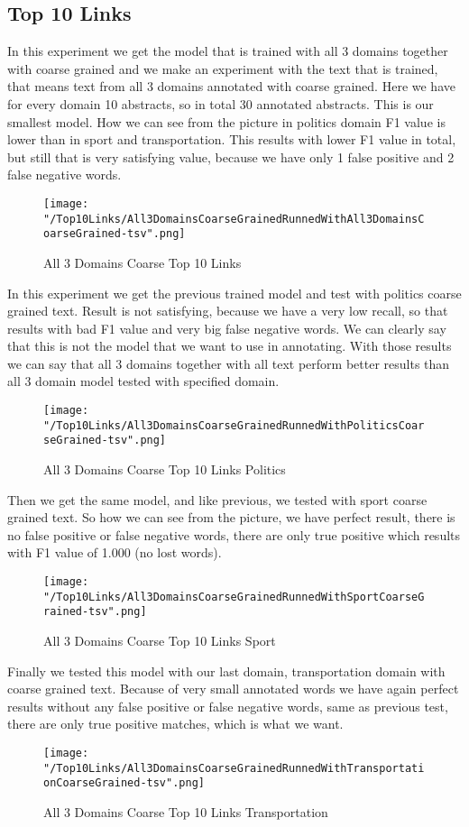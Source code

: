 \documentclass[thesis=M,english]{FITthesis}[2018/05/30]
\begin{document}
\subsection{Top 10 Links}\label{subsec:Top10}
	In this experiment we get the model that is trained with all 3 domains together with coarse grained and we make an experiment with the text that is trained, that means text from all 3 domains annotated with coarse grained. 
	Here we have for every domain 10 abstracts, so in total 30 annotated abstracts. This is our smallest model.
	How we can see from the picture in politics domain F1 value is lower than in sport and transportation. This results with lower F1 value in total, but still that is very satisfying value, because we have only 1 false positive and 2 false negative words.  
	\begin{figure}[H]\centering
		\texttt{[image: "/Top10Links/All3DomainsCoarseGrainedRunnedWithAll3DomainsCoarseGrained-tsv".png]}
		\caption{All 3 Domains Coarse Top 10 Links}\label{}
	\end{figure}
	
	
	In this experiment we get the previous trained model and test with politics coarse grained text. Result is not satisfying, because we have a very low recall, so that results with bad F1 value and very big false negative words. We can clearly say that this is not the model that we want to use in annotating. With those results we can say that all 3 domains together with all text perform better results than all 3 domain model tested with specified domain.  
	\begin{figure}[H]\centering
		\texttt{[image: "/Top10Links/All3DomainsCoarseGrainedRunnedWithPoliticsCoarseGrained-tsv".png]}
		\caption{All 3 Domains Coarse Top 10 Links Politics}\label{}
	\end{figure}	

	Then we get the same model, and like previous, we tested with sport coarse grained text. So how we can see from the picture, we have perfect result, there is no false positive or false negative words, there are only true positive which results with F1 value of 1.000 (no lost words).
	\begin{figure}[H]\centering
		\texttt{[image: "/Top10Links/All3DomainsCoarseGrainedRunnedWithSportCoarseGrained-tsv".png]}
		\caption{All 3 Domains Coarse Top 10 Links Sport}\label{}
	\end{figure}
	
	Finally we tested this model with our last domain, transportation domain with coarse grained text.	Because of very small annotated words we have again perfect results without any false positive or false negative words, same as previous test, there are only true positive matches, which is what we want.
	\begin{figure}[H]\centering
		\texttt{[image: "/Top10Links/All3DomainsCoarseGrainedRunnedWithTransportationCoarseGrained-tsv".png]}
		\caption{All 3 Domains Coarse Top 10 Links Transportation}\label{}	
	\end{figure}
		
\end{document}
